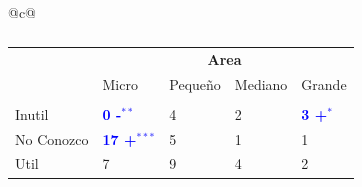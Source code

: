 \documentclass[a4paper, nobind]{templates/ociamthesis}
\begin{document}
\begin{table}

 \centering
  \begin{threeparttable}
  \caption[Asociación entre el factor Área y PPs]{Tablas de contingencia donde el factor Area tuvo una asosiación significativa con alguna PP.}
  \label{tab:area-posthoc}
\begin{tabular}{@{}c@{}} %
\begin{minipage}{\textwidth}

\begin{subtable}[b]{\textwidth}
\centering

\begin{tabular}{lllll}
\toprule
\multicolumn{1}{c}{\textbf{ }} & \multicolumn{4}{c}{\textbf{Area}} \\
  & Micro & Pequeño & Mediano & Grande\\
\midrule
\addlinespace[0.3em]
\multicolumn{5}{l}{\textbf{Granja}}\\
\hspace{1em}Inutil & \textcolor{blue}{\textbf{0 -$^{**}$}} & 4 & 2 & \textcolor{blue}{\textbf{3 +$^{*}$}}\\
\hspace{1em}No Conozco & \textcolor{blue}{\textbf{17 +$^{***}$}} & 5 & 1 & 1\\
\hspace{1em}Util & 7 & 9 & 4 & 2\\
\bottomrule
\end{tabular}
 \caption{}
 \label{tab:area-granja}
\end{subtable}
\hfill

\begin{subtable}[b]{\textwidth}
\centering


\end{subtable}
\end{minipage}
\end{tabular}
\end{threeparttable}
\end{table}
\end{document}
